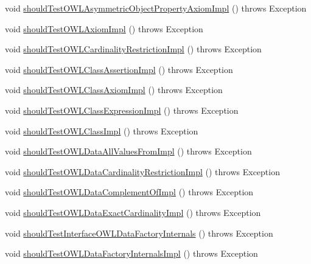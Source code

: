 \begin{DoxyCompactItemize}
\item 
void \hyperlink{classorg_1_1semanticweb_1_1owlapi_1_1contract_1_1_contract_owlapi__1_test_aeb0be8b3f251106832736afa4ed3422e}{should\-Test\-O\-W\-L\-Asymmetric\-Object\-Property\-Axiom\-Impl} ()  throws Exception 
\item 
void \hyperlink{classorg_1_1semanticweb_1_1owlapi_1_1contract_1_1_contract_owlapi__1_test_a1781abee4c51e80d9ef2ad12b23f8059}{should\-Test\-O\-W\-L\-Axiom\-Impl} ()  throws Exception 
\item 
void \hyperlink{classorg_1_1semanticweb_1_1owlapi_1_1contract_1_1_contract_owlapi__1_test_a59dc7fcb9dfb0b9213c4027cc6111180}{should\-Test\-O\-W\-L\-Cardinality\-Restriction\-Impl} ()  throws Exception 
\item 
void \hyperlink{classorg_1_1semanticweb_1_1owlapi_1_1contract_1_1_contract_owlapi__1_test_a48a0c67e8d61edde67c715a999b53e6b}{should\-Test\-O\-W\-L\-Class\-Assertion\-Impl} ()  throws Exception 
\item 
void \hyperlink{classorg_1_1semanticweb_1_1owlapi_1_1contract_1_1_contract_owlapi__1_test_aba30e26d1c6117f5f59445b7e0814782}{should\-Test\-O\-W\-L\-Class\-Axiom\-Impl} ()  throws Exception 
\item 
void \hyperlink{classorg_1_1semanticweb_1_1owlapi_1_1contract_1_1_contract_owlapi__1_test_ab6194ac805151418d569159d6c27a0cf}{should\-Test\-O\-W\-L\-Class\-Expression\-Impl} ()  throws Exception 
\item 
void \hyperlink{classorg_1_1semanticweb_1_1owlapi_1_1contract_1_1_contract_owlapi__1_test_a0758c41a637a767aed24d38a15ab8a68}{should\-Test\-O\-W\-L\-Class\-Impl} ()  throws Exception 
\item 
void \hyperlink{classorg_1_1semanticweb_1_1owlapi_1_1contract_1_1_contract_owlapi__1_test_aa29ac4b7d60dc43071877564f08741ca}{should\-Test\-O\-W\-L\-Data\-All\-Values\-From\-Impl} ()  throws Exception 
\item 
void \hyperlink{classorg_1_1semanticweb_1_1owlapi_1_1contract_1_1_contract_owlapi__1_test_a747c9782c07a2cfc66d8e5b58bd0cacf}{should\-Test\-O\-W\-L\-Data\-Cardinality\-Restriction\-Impl} ()  throws Exception 
\item 
void \hyperlink{classorg_1_1semanticweb_1_1owlapi_1_1contract_1_1_contract_owlapi__1_test_a54f5d513d465eaefed6e6b67bdffa935}{should\-Test\-O\-W\-L\-Data\-Complement\-Of\-Impl} ()  throws Exception 
\item 
void \hyperlink{classorg_1_1semanticweb_1_1owlapi_1_1contract_1_1_contract_owlapi__1_test_a2a4d812d760793d2c0e5716eb5690ce0}{should\-Test\-O\-W\-L\-Data\-Exact\-Cardinality\-Impl} ()  throws Exception 
\item 
void \hyperlink{classorg_1_1semanticweb_1_1owlapi_1_1contract_1_1_contract_owlapi__1_test_addc70701bde7aa0bef61005ba9108df8}{should\-Test\-Interface\-O\-W\-L\-Data\-Factory\-Internals} ()  throws Exception 
\item 
void \hyperlink{classorg_1_1semanticweb_1_1owlapi_1_1contract_1_1_contract_owlapi__1_test_aa62161f3fd2fa3c5c94fb62774df470f}{should\-Test\-O\-W\-L\-Data\-Factory\-Internals\-Impl} ()  throws Exception 
\end{DoxyCompactItemize}


